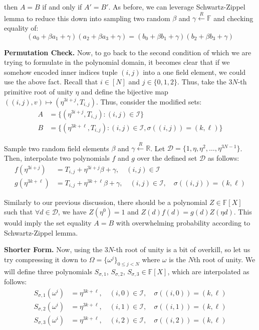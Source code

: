 \documentclass[../lecture-notes.tex]{subfiles}
\begin{document}
then $A=B$ if and only if $A'=B'$. As before, we can leverage Schwartz-Zippel lemma to reduce this down into sampling two random $\beta$ and $\gamma \xleftarrow{R} \mathbb{F}$ and checking equality of:
\begin{equation*}
    (a_0 + \beta a_1 + \gamma)(a_2 + \beta a_3 + \gamma) = (b_0 + \beta b_1 + \gamma)(b_2 + \beta b_3 + \gamma)
\end{equation*}

\textbf{Permutation Check.} Now, to go back to the second condition of
 which we are trying to formulate in the polynomial
domain, it becomes clear that if we somehow encoded inner indices tuple $(i, j)$
into a one field element, we could use the above fact. Recall that $i \in [N]$
and $j \in \{0,1,2\}$. Thus, take the $3N$-th primitive root of unity $\eta$ and
define the bijective map $((i,j),v) \mapsto (\eta^{3i+j}, T_{i,j})$. Thus,
consider the modified sets:
\begin{align*}
    A &= \{(\eta^{3i+j}, T_{i,j}) : (i, j) \in \mathcal{I}\} \\
    B &= \{(\eta^{3k+\ell}, T_{i,j}) : (i, j) \in \mathcal{I}, \sigma((i, j)) = (k, \ell)\}
\end{align*}

Sample two random field elements $\beta$ and $\gamma \xleftarrow{R} \mathbb{R}$. Let $\mathcal{D} = \{1, \eta, \eta^2, \ldots, \eta^{3N-1}\}$. Then, interpolate two polynomials $f$ and $g$ over the defined set $\mathcal{D}$ as follows:
\begin{align*}
    f(\eta^{3i+j}) &= T_{i,j} + \eta^{3i+j}\beta + \gamma, \quad (i, j) \in \mathcal{I} \\
    g(\eta^{3k+\ell}) &= T_{i,j} + \eta^{3k+\ell}\beta + \gamma, \quad (i, j) \in \mathcal{I}, \quad \sigma((i, j)) = (k, \ell)
\end{align*}

Similarly to our previous discussion, there should be a polynomial $Z \in
\mathbb{F}[X]$ such that $\forall d \in \mathcal{D}$, we have $Z(\eta^{0}) = 1$ and
$Z(d)f(d) = g(d)Z(\eta d)$. This would imply the set equality $A=B$ with
overwhelming probability according to Schwartz-Zippel lemma.

\textbf{Shorter Form.} Now, using the $3N$-th root of unity is a bit of overkill,
so let us try compressing it down to $\Omega = \{\omega^j\}_{0 \leq j < N}$
where $\omega$ is the $N$th root of unity. We will define three polynomials
$S_{\sigma,1}$, $S_{\sigma,2}$, $S_{\sigma,3} \in \mathbb{F}[X]$, which are
interpolated as follows:
\begin{align*}
    S_{\sigma,1}(\omega^i) &= \eta^{3k+\ell}, \quad (i, 0) \in \mathcal{I}, \quad \sigma((i, 0)) = (k, \ell) \\
    S_{\sigma,2}(\omega^i) &= \eta^{3k+\ell}, \quad (i, 1) \in \mathcal{I}, \quad \sigma((i, 1)) = (k, \ell) \\
    S_{\sigma,3}(\omega^i) &= \eta^{3k+\ell}, \quad (i, 2) \in \mathcal{I}, \quad \sigma((i, 2)) = (k, \ell)
\end{align*}
\end{document}
